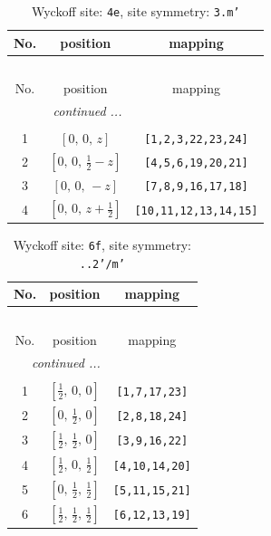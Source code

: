 \documentclass[fleqn,8pt]{jsarticle}
\begin{document}
\renewcommand{\arraystretch}{1.2}
\begin{longtable}{ccc}
\caption{Wyckoff site: {\tt 4e}, site symmetry: {\tt 3.m'}}
 \\
 \hline \hline
No. & position & mapping \\ \hline \endfirsthead

\multicolumn{2}{l}{\tablename\ \thetable{}} \\
 \hline \hline
No. & position & mapping \\ \hline \endhead

 \hline \hline
\multicolumn{2}{r}{\footnotesize\it continued ...} \\ \endfoot

 \hline \hline
\multicolumn{2}{r}{} \\ \endlastfoot

1 & $\left[ 0,\, 0,\, z \right]$ & {\tt [1,2,3,22,23,24]} \\ \hline
2 & $\left[ 0,\, 0,\, \frac{1}{2} - z \right]$ & {\tt [4,5,6,19,20,21]} \\ \hline
3 & $\left[ 0,\, 0,\, - z \right]$ & {\tt [7,8,9,16,17,18]} \\ \hline
4 & $\left[ 0,\, 0,\, z + \frac{1}{2} \right]$ & {\tt [10,11,12,13,14,15]} \\
\end{longtable}
\renewcommand{\arraystretch}{1.2}
\begin{longtable}{ccc}
\caption{Wyckoff site: {\tt 6f}, site symmetry: {\tt ..2'/m'}}
 \\
 \hline \hline
No. & position & mapping \\ \hline \endfirsthead

\multicolumn{2}{l}{\tablename\ \thetable{}} \\
 \hline \hline
No. & position & mapping \\ \hline \endhead

 \hline \hline
\multicolumn{2}{r}{\footnotesize\it continued ...} \\ \endfoot

 \hline \hline
\multicolumn{2}{r}{} \\ \endlastfoot

1 & $\left[ \frac{1}{2},\, 0,\, 0 \right]$ & {\tt [1,7,17,23]} \\ \hline
2 & $\left[ 0,\, \frac{1}{2},\, 0 \right]$ & {\tt [2,8,18,24]} \\ \hline
3 & $\left[ \frac{1}{2},\, \frac{1}{2},\, 0 \right]$ & {\tt [3,9,16,22]} \\ \hline
4 & $\left[ \frac{1}{2},\, 0,\, \frac{1}{2} \right]$ & {\tt [4,10,14,20]} \\ \hline
5 & $\left[ 0,\, \frac{1}{2},\, \frac{1}{2} \right]$ & {\tt [5,11,15,21]} \\ \hline
6 & $\left[ \frac{1}{2},\, \frac{1}{2},\, \frac{1}{2} \right]$ & {\tt [6,12,13,19]} \\
\end{longtable}
\end{document}
